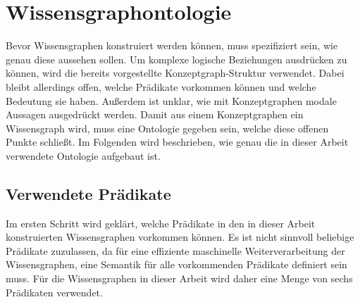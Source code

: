 \section{Wissensgraphontologie}%
\label{sec:text2kg:ontology}

Bevor Wissensgraphen konstruiert werden können, muss spezifiziert sein, wie genau diese aussehen sollen.
Um komplexe logische Beziehungen ausdrücken zu können, wird die bereits vorgestellte Konzeptgraph-Struktur verwendet.
Dabei bleibt allerdings offen, welche Prädikate vorkommen können und welche Bedeutung sie haben.
Außerdem ist unklar, wie mit Konzeptgraphen modale Aussagen ausgedrückt werden.
Damit aus einem Konzeptgraphen ein Wissensgraph wird, muss eine Ontologie gegeben sein, welche diese offenen Punkte schließt.
Im Folgenden wird beschrieben, wie genau die in dieser Arbeit verwendete Ontologie aufgebaut ist.

\subsection{Verwendete Prädikate}%
\label{sec:text2kg:ontology:pred}

Im ersten Schritt wird geklärt, welche Prädikate in den in dieser Arbeit konstruierten Wissensgraphen vorkommen können.
Es ist nicht sinnvoll beliebige Prädikate zuzulassen, da für eine effiziente maschinelle Weiterverarbeitung der Wissensgraphen, eine Semantik für alle vorkommenden Prädikate definiert sein muss.
Für die Wissensgraphen in dieser Arbeit wird daher eine Menge von sechs Prädikaten verwendet.

